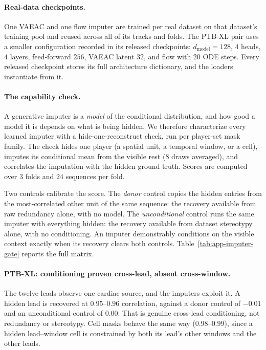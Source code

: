 \paragraph{Real-data checkpoints.}
One VAEAC and one flow imputer are trained per real dataset on that
dataset's training pool and reused across all of its tracks and folds.  The
PTB-XL pair uses a smaller configuration recorded in its released
checkpoints: $d_{\mathrm{model}}{=}128$, $4$ heads, $4$ layers, feed-forward
$256$, VAEAC latent $32$, and flow with $20$ ODE steps.  Every released
checkpoint stores its full architecture dictionary, and the loaders
instantiate from it.

\paragraph{The capability check.}
A generative imputer is a \emph{model} of the conditional distribution, and how
good a model it is depends on what is being hidden.  We therefore
characterize every learned imputer with a hide-one-reconstruct check, run
per player-set mask family.  The check hides one player (a spatial unit, a
temporal window, or a cell), imputes its conditional mean from the visible
rest ($8$ draws averaged), and correlates the imputation with the hidden
ground truth.  Scores are computed over $3$ folds and $24$ sequences per
fold.

Two controls calibrate the score.  The \emph{donor} control copies the
hidden entries from the most-correlated other unit of the same sequence:
the recovery available from raw redundancy alone, with no model.  The
\emph{unconditional} control runs the same imputer with everything hidden:
the recovery available from dataset stereotypy alone, with no conditioning.
An imputer demonstrably conditions on the visible context exactly when its
recovery clears both controls.  Table~\ref{tab:app-imputer-gate} reports
the full matrix.



\paragraph{PTB-XL: conditioning proven cross-lead, absent cross-window.}
The twelve leads observe one cardiac source, and the imputers exploit it.
A hidden lead is recovered at $0.95$--$0.96$ correlation, against a donor
control of $-0.01$ and an unconditional control of $0.00$.  That is genuine
cross-lead conditioning, not redundancy or stereotypy.  Cell masks behave
the same way ($0.98$--$0.99$), since a hidden lead--window cell is
constrained by both its lead's other windows and the other leads.

